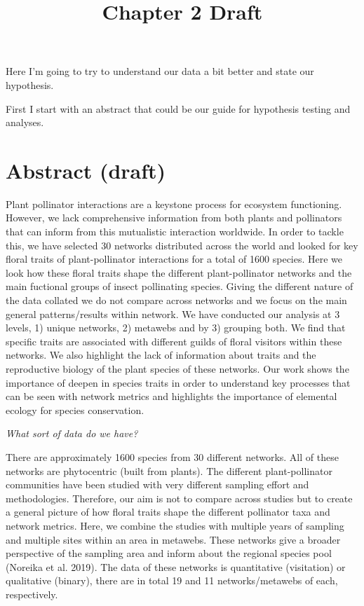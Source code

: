 \documentclass[12pt,]{article}
\title{Chapter 2 Draft}
\author{}
\date{\vspace{-2.5em}}
\begin{document}
\maketitle

Here I'm going to try to understand our data a bit better and state our
hypothesis.

First I start with an abstract that could be our guide for hypothesis
testing and analyses.

\section{Abstract (draft)}\label{abstract-draft}

Plant pollinator interactions are a keystone process for ecosystem
functioning. However, we lack comprehensive information from both plants
and pollinators that can inform from this mutualistic interaction
worldwide. In order to tackle this, we have selected 30 networks
distributed across the world and looked for key floral traits of
plant-pollinator interactions for a total of 1600 species. Here we look
how these floral traits shape the different plant-pollinator networks
and the main fuctional groups of insect pollinating species. Giving the
different nature of the data collated we do not compare across networks
and we focus on the main general patterns/results within network. We
have conducted our analysis at 3 levels, 1) unique networks, 2) metawebs
and by 3) grouping both. We find that specific traits are associated
with different guilds of floral visitors within these networks. We also
highlight the lack of information about traits and the reproductive
biology of the plant species of these networks. Our work shows the
importance of deepen in species traits in order to understand key
processes that can be seen with network metrics and highlights the
importance of elemental ecology for species conservation.

\emph{What sort of data do we have?}

There are approximately 1600 species from 30 different networks. All of
these networks are phytocentric (built from plants). The different
plant-pollinator communities have been studied with very different
sampling effort and methodologies. Therefore, our aim is not to compare
across studies but to create a general picture of how floral traits
shape the different pollinator taxa and network metrics. Here, we
combine the studies with multiple years of sampling and multiple sites
within an area in metawebs. These networks give a broader perspective of
the sampling area and inform about the regional species pool (Noreika et
al. 2019). The data of these networks is quantitative (visitation) or
qualitative (binary), there are in total 19 and 11 networks/metawebs of
each, respectively.
\end{document}
